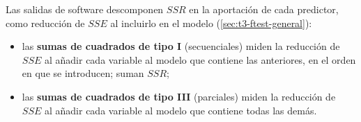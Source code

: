 \begin{nota}
  Las salidas de software descomponen $SSR$ en la aportación de cada predictor, como reducción de
  $SSE$ al incluirlo en el modelo (\cref{sec:t3-ftest-general}):
  \begin{itemize}
    \item las \textbf{sumas de cuadrados de tipo I} (secuenciales) miden la reducción de $SSE$ al
      añadir cada variable al modelo que contiene las anteriores, en el orden en que se
      introducen; suman $SSR$;
    \item las \textbf{sumas de cuadrados de tipo III} (parciales) miden la reducción de $SSE$ al
      añadir cada variable al modelo que contiene todas las demás.
  \end{itemize}
\end{nota}
